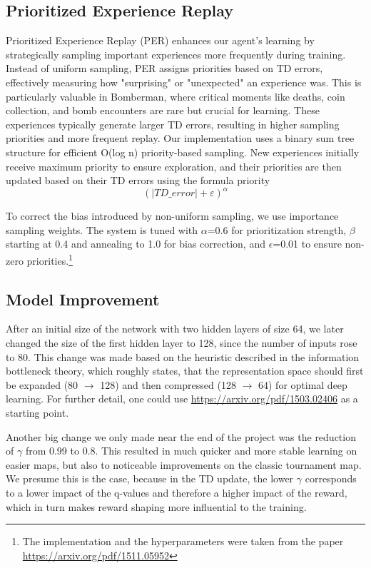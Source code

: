 \documentclass{article} %
\begin{document}
	\subsection{Prioritized Experience Replay}
	Prioritized Experience Replay (PER) enhances our agent's learning by strategically sampling important experiences more frequently during training. Instead of uniform sampling, PER assigns priorities based on TD errors, effectively measuring how "surprising" or "unexpected" an experience was. This is particularly valuable in Bomberman, where critical moments like deaths, coin collection, and bomb encounters are rare but crucial for learning. These experiences typically generate larger TD errors, resulting in higher sampling priorities and more frequent replay. Our implementation uses a binary sum tree structure for efficient O(log n) priority-based sampling. New experiences initially receive maximum priority to ensure exploration, and their priorities are then updated based on their TD errors using the formula priority
	\begin{equation}
		(|TD\_error| + \varepsilon)^{\alpha}
	\end{equation}
	
	To correct the bias introduced by non-uniform sampling, we use importance sampling weights. The system is tuned with $\alpha$=0.6 for prioritization strength, $\beta$ starting at 0.4 and annealing to 1.0 for bias correction, and $\epsilon$=0.01 to ensure non-zero priorities.\footnote{The implementation and the hyperparameters were taken from the paper \url{https://arxiv.org/pdf/1511.05952}}
	
	
	\subsection{Model Improvement}
	After an initial size of the network with two hidden layers of size 64, we later changed the size of the first hidden layer to 128, since the number of inputs rose to 80. This change was made based on the heuristic described in the information bottleneck theory, which roughly states, that the representation space should first be expanded (80 $\rightarrow$ 128) and then compressed (128 $\rightarrow$ 64) for optimal deep learning. For further detail, one could use \url{https://arxiv.org/pdf/1503.02406} as a starting point.
	
	Another big change we only made near the end of the project was the reduction of $\gamma$ from 0.99 to 0.8. This resulted in much quicker and more stable learning on easier maps, but also to noticeable improvements on the classic tournament map. We presume this is the case, because in the TD update, the lower $\gamma$ corresponds to a lower impact of the q-values and therefore a higher impact of the reward, which in turn makes reward shaping more influential to the training.
	
\end{document}
